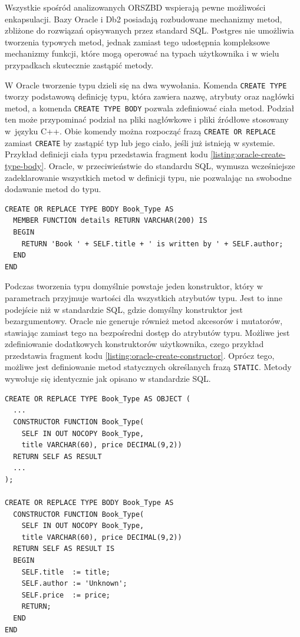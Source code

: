 \documentclass[a4paper,twoside,12pt]{book}
\begin{document}
Wszystkie spośród analizowanych ORSZBD wspierają pewne możliwości enkapsulacji. Bazy Oracle i Db2 posiadają rozbudowane mechanizmy metod, zbliżone do rozwiązań opisywanych przez standard SQL. Postgres nie umożliwia tworzenia typowych metod, jednak zamiast tego udostępnia kompleksowe mechanizmy funkcji, które mogą operować na typach użytkownika i w wielu przypadkach skutecznie zastąpić metody.

W Oracle tworzenie typu dzieli się na dwa wywołania. Komenda \lstinline{CREATE TYPE} tworzy podstawową definicję typu, która zawiera nazwę, atrybuty oraz nagłówki metod, a komenda \lstinline{CREATE TYPE BODY} pozwala zdefiniować ciała metod. Podział ten może przypominać podział na pliki nagłówkowe i pliki źródłowe stosowany w~języku C++. Obie komendy można rozpocząć frazą \lstinline{CREATE OR REPLACE} zamiast \lstinline{CREATE} by zastąpić typ lub jego ciało, jeśli już istnieją w systemie. Przykład definicji ciała typu przedstawia fragment kodu \ref{listing:oracle-create-type-body}. Oracle, w przeciwieństwie do standardu SQL, wymusza wcześniejsze zadeklarowanie wszystkich metod w definicji typu, nie pozwalając na swobodne dodawanie metod do typu.

\begin{lstlisting}[style=SQL, caption={Definicja ciała typu w Oracle Database.}, label={listing:oracle-create-type-body}, captionpos=b]
CREATE OR REPLACE TYPE BODY Book_Type AS
  MEMBER FUNCTION details RETURN VARCHAR(200) IS
  BEGIN
    RETURN 'Book ' + SELF.title + ' is written by ' + SELF.author;
  END
END
\end{lstlisting}

Podczas tworzenia typu domyślnie powstaje jeden konstruktor, który w parametrach przyjmuje wartości dla wszystkich atrybutów typu. Jest to inne podejście niż w standardzie SQL, gdzie domyślny konstruktor jest bezargumentowy. Oracle nie generuje również metod akcesorów i mutatorów, stawiając zamiast tego na bezpośredni dostęp do atrybutów typu. Możliwe jest zdefiniowanie dodatkowych konstruktorów użytkownika, czego przykład przedstawia fragment kodu \ref{listing:oracle-create-constructor}. Oprócz tego, możliwe jest definiowanie metod statycznych określanych frazą \lstinline{STATIC}. Metody wywołuje się identycznie jak opisano w standardzie SQL.

\begin{lstlisting}[style=SQL, caption={Definicja konstruktora typu w Oracle Database.}, label={listing:oracle-create-constructor}, captionpos=b]
CREATE OR REPLACE TYPE Book_Type AS OBJECT (
  ...
  CONSTRUCTOR FUNCTION Book_Type(
    SELF IN OUT NOCOPY Book_Type, 
    title VARCHAR(60), price DECIMAL(9,2))
  RETURN SELF AS RESULT
  ...
);

CREATE OR REPLACE TYPE BODY Book_Type AS
  CONSTRUCTOR FUNCTION Book_Type(
    SELF IN OUT NOCOPY Book_Type, 
    title VARCHAR(60), price DECIMAL(9,2))
  RETURN SELF AS RESULT IS
  BEGIN
    SELF.title  := title;
    SELF.author := 'Unknown';
    SELF.price  := price;
    RETURN;
  END
END
\end{lstlisting}
\end{document}
